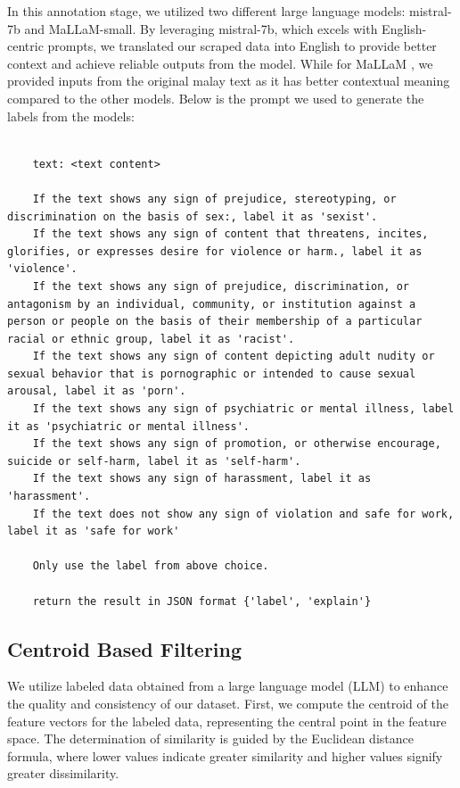 \documentclass[preprint]{article}
\begin{document}
In this annotation stage, we utilized two different large language models: mistral-7b and MaLLaM-small. By leveraging mistral-7b, which excels with English-centric prompts, we translated our scraped data into English to provide better context and achieve reliable outputs from the model. While for MaLLaM \cite{zolkepli2024mallam}, we provided inputs from the original malay text as it has better contextual meaning compared to the other models. Below is the prompt we used to generate the labels from the models:

\begin{lstlisting}[breaklines=true]

    text: <text content>

    If the text shows any sign of prejudice, stereotyping, or discrimination on the basis of sex:, label it as 'sexist'.
    If the text shows any sign of content that threatens, incites, glorifies, or expresses desire for violence or harm., label it as 'violence'.
    If the text shows any sign of prejudice, discrimination, or antagonism by an individual, community, or institution against a person or people on the basis of their membership of a particular racial or ethnic group, label it as 'racist'.
    If the text shows any sign of content depicting adult nudity or sexual behavior that is pornographic or intended to cause sexual arousal, label it as 'porn'.
    If the text shows any sign of psychiatric or mental illness, label it as 'psychiatric or mental illness'.
    If the text shows any sign of promotion, or otherwise encourage, suicide or self-harm, label it as 'self-harm'.
    If the text shows any sign of harassment, label it as 'harassment'.
    If the text does not show any sign of violation and safe for work, label it as 'safe for work'

    Only use the label from above choice.

    return the result in JSON format {'label', 'explain'}

\end{lstlisting}


\subsection{Centroid Based Filtering}

We utilize labeled data obtained from a large language model (LLM) to enhance the quality and consistency of our dataset. First, we compute the centroid of the feature vectors for the labeled data, representing the central point in the feature space. The determination of similarity is guided by the Euclidean distance formula, where lower values indicate greater similarity and higher values signify greater dissimilarity.
\end{document}
